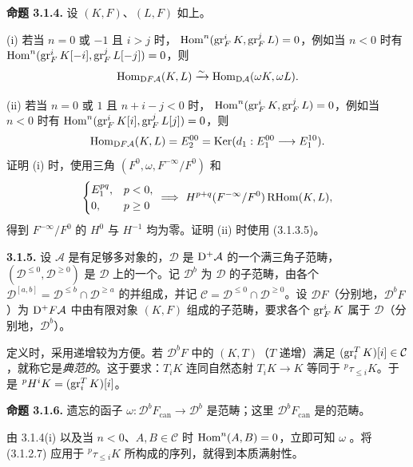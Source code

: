 \par\medskip\noindent\textbf{命题 3.1.4.}
设 $(K,F)$、$(L,F)$ 如上。

(i) 若当 $n=0$ 或 $-1$ 且 $i>j$ 时，
$\operatorname{Hom}^n(\operatorname{gr}_F^iK,\operatorname{gr}_F^jL)=0$，例如当 $n<0$ 时有
$\operatorname{Hom}^n(\operatorname{gr}_F^iK[-i],\operatorname{gr}_F^jL[-j])=0$，则
\[
\operatorname{Hom}_{\mathrm{D} F\mathcal A}(K,L)\xrightarrow{\sim}
\operatorname{Hom}_{\mathrm{D}\mathcal A}(\omega K,\omega L).
\]

(ii) 若当 $n=0$ 或 $1$ 且 $n+i-j<0$ 时，
$\operatorname{Hom}^n(\operatorname{gr}_F^iK,\operatorname{gr}_F^jL)=0$，例如当 $n<0$ 时有
$\operatorname{Hom}^n(\operatorname{gr}_F^iK[i],\operatorname{gr}_F^jL[j])=0$，则
\[
\operatorname{Hom}_{\mathrm{D} F\mathcal A}(K,L)=E_2^{00}
 =\operatorname{Ker}(d_1:E_1^{00}\longrightarrow E_1^{10}).
\]
证明 (i) 时，使用三角 $(F^0,\omega,F^{-\infty}/F^0)$ 和
\[
\begin{cases}
E_1^{pq},&p<0,\\
0,&p\geq0
\end{cases}
\ \Longrightarrow\ H^{p+q}(F^{-\infty}/F^0)\operatorname{RHom}(K,L),
\]
得到 $F^{-\infty}/F^0$ 的 $H^0$ 与 $H^{-1}$ 均为零。证明 (ii) 时使用 (3.1.3.5)。

\par\medskip\noindent\textbf{3.1.5.}
设 $\mathcal A$ 是有足够多对象的，$\mathcal D$ 是 $\mathrm{D}^+\mathcal A$ 的一个满三角子范畴，$(\mathcal D^{\leq0},\mathcal D^{\geq0})$ 是 $\mathcal D$ 上的一个。记 $\mathcal D^b$ 为 $\mathcal D$ 的子范畴，由各个
$\mathcal D^{[a,b]}=\mathcal D^{\leq b}\cap\mathcal D^{\geq a}$ 的并组成，并记
$\mathcal C=\mathcal D^{\leq0}\cap\mathcal D^{\geq0}$。设 $\mathcal D F$（分别地，$\mathcal D^bF$）为 $\mathrm{D}^+F\mathcal A$ 中由有限对象 $(K,F)$ 组成的子范畴，要求各个 $\operatorname{gr}_F^iK$ 属于 $\mathcal D$（分别地，$\mathcal D^b$）。

定义时，采用递增较为方便。若 $\mathcal D^bF$ 中的 $(K,T)$（$T$ 递增）满足 $(\operatorname{gr}_i^TK)[i]\in\mathcal C$，就称它是\emph{典范的}。这于要求：$T_iK$ 连同自然态射 $T_iK\longrightarrow K$ 等同于 ${}^p\tau_{\leq i}K$。于是
${}^pH^iK=(\operatorname{gr}_i^TK)[i]$。

\par\medskip\noindent\textbf{命题 3.1.6.}
遗忘的函子
$\omega:\mathcal D^bF_{\mathrm{can}}\longrightarrow\mathcal D^b$
是范畴；这里 $\mathcal D^bF_{\mathrm{can}}$ 是的范畴。

由 3.1.4(i) 以及当 $n<0$、$A,B\in\mathcal C$ 时 $\operatorname{Hom}^n(A,B)=0$，立即可知 $\omega$ 。将 (3.1.2.7) 应用于 ${}^p\tau_{\leq i}K$ 所构成的序列，就得到本质满射性。

